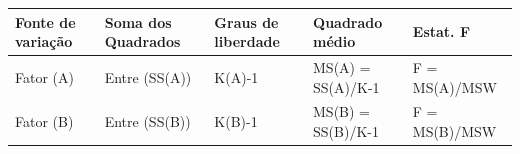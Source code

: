 \documentclass[
]{book}
\begin{document}
\begin{longtable}[]{@{}lllll@{}}
\toprule
\begin{minipage}[b]{0.17\columnwidth}\raggedright
Fonte de variação\strut
\end{minipage} & \begin{minipage}[b]{0.17\columnwidth}\raggedright
Soma dos Quadrados\strut
\end{minipage} & \begin{minipage}[b]{0.17\columnwidth}\raggedright
Graus de liberdade\strut
\end{minipage} & \begin{minipage}[b]{0.17\columnwidth}\raggedright
Quadrado médio\strut
\end{minipage} & \begin{minipage}[b]{0.17\columnwidth}\raggedright
Estat. F\strut
\end{minipage}\tabularnewline
\midrule
\endhead
\begin{minipage}[t]{0.17\columnwidth}\raggedright
Fator (A)\strut
\end{minipage} & \begin{minipage}[t]{0.17\columnwidth}\raggedright
Entre (SS(A))\strut
\end{minipage} & \begin{minipage}[t]{0.17\columnwidth}\raggedright
K(A)-1\strut
\end{minipage} & \begin{minipage}[t]{0.17\columnwidth}\raggedright
MS(A) = SS(A)/K-1\strut
\end{minipage} & \begin{minipage}[t]{0.17\columnwidth}\raggedright
F = MS(A)/MSW\strut
\end{minipage}\tabularnewline
\begin{minipage}[t]{0.17\columnwidth}\raggedright
Fator (B)\strut
\end{minipage} & \begin{minipage}[t]{0.17\columnwidth}\raggedright
Entre (SS(B))\strut
\end{minipage} & \begin{minipage}[t]{0.17\columnwidth}\raggedright
K(B)-1\strut
\end{minipage} & \begin{minipage}[t]{0.17\columnwidth}\raggedright
MS(B) = SS(B)/K-1\strut
\end{minipage} & \begin{minipage}[t]{0.17\columnwidth}\raggedright
F = MS(B)/MSW\strut
\end{minipage}\tabularnewline

\end{longtable}
\end{document}
